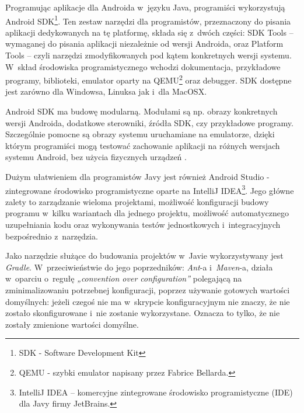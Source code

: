 Programując aplikacje dla Androida w~języku Java, programiści wykorzystują Android SDK\footnote{SDK - Software Development Kit}. Ten zestaw narzędzi dla programistów, przeznaczony do pisania aplikacji dedykowanych na tę platformę, składa się z~dwóch części: SDK Tools – wymaganej do pisania aplikacji niezależnie od wersji Androida, oraz Platform Tools – czyli narzędzi zmodyfikowanych pod kątem konkretnych wersji systemu. W~skład środowiska programistycznego wchodzi dokumentacja, przykładowe programy, biblioteki, emulator oparty na QEMU\footnote{QEMU - szybki emulator napisany przez Fabrice Bellarda.} oraz debugger. SDK dostępne jest zarówno dla Windowsa, Linuksa jak i~dla MacOSX.

Android SDK ma budowę modularną. Modułami są np. obrazy konkretnych wersji Androida, dodatkowe sterowniki, źródła SDK, czy przykładowe programy. Szczególnie pomocne są obrazy systemu uruchamiane na emulatorze, dzięki którym programiści mogą  testować zachowanie aplikacji na różnych wersjach systemu Android, bez użycia fizycznych urządzeń \cite{website:android:sdk}.

Dużym ułatwieniem dla programistów Javy jest również Android Studio - zintegrowane środowisko programistyczne oparte na IntelliJ IDEA\footnote{IntelliJ IDEA – komercyjne zintegrowane środowisko programistyczne (IDE) dla Javy firmy JetBrains.}. Jego główne zalety to zarządzanie wieloma projektami, możliwość konfiguracji budowy programu w~kilku wariantach dla jednego projektu, możliwość automatycznego uzupełniania kodu oraz wykonywania testów jednostkowych i~integracyjnych bezpośrednio z~narzędzia.

Jako narzędzie służące do budowania projektów w~Javie wykorzystywany jest \textit{Gradle}. W~przeciwieństwie do jego poprzedników: \textit{Ant}-a i~\textit{Maven}-a, działa w~oparciu o~regułę \textit{„convention over configuration”} polegającą na zminimalizowaniu potrzebnej konfiguracji, poprzez używanie gotowych wartości domyślnych: jeżeli czegoś nie ma w~skrypcie konfiguracyjnym nie znaczy, że nie zostało skonfigurowane i~nie zostanie wykorzystane. Oznacza to tylko, że nie zostały zmienione wartości domyślne.

